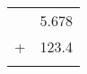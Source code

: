 \documentclass[border=1mm,12pt]{standalone}
\def\decA{5.678}
\def\decB{123.4}
\begin{document}
\begin{tabular}{c r}
    & \num{\decA} \\
    + & \num{\decB} \\
    \hline
    &  \\
    \hline
\end{tabular}
\end{document}
